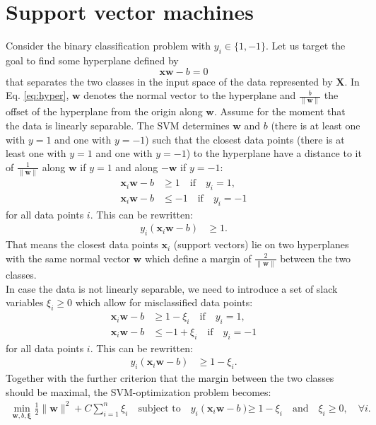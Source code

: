 \documentclass[11pt, a4paper, parskip=half*, bibliography=totoc, cleardoublepage=empty, final,
numbers=noenddot]{scrbook}
\begin{document}
\section{Support vector machines}
Consider the binary classification problem with $y_i \in \{ 1, -1 \}$. Let us target the goal to find some hyperplane defined by
\begin{equation}
\bm{x} \bm{w} - b =0
\label{eq:hyper}
\end{equation} 
that separates the two classes in the input space of the data represented by $\bm{X}$. In Eq. \ref{eq:hyper}, $\bm{w}$ denotes the normal vector to the hyperplane and $\frac{b}{\| \bm{w} \|}$ the offset of the hyperplane from the origin along $\bm{w}$. Assume for the moment that the data is linearly separable. The SVM determines $\bm{w}$ and $b$ (there is at least one with $y=1$ and one with $y=-1$) such that the closest data points (there is at least one with $y=1$ and one with $y=-1$) to the hyperplane have a distance to it of $\frac{1}{\| \bm{w} \|}$ along $\bm{w}$ if $y=1$ and along $-\bm{w}$ if $y=-1$: 
\begin{align}
\bm{x}_i \bm{w} - b &\geq 1 \quad   \text{if} \quad   y_i=1,\\
\bm{x}_i \bm{w} - b &\leq -1 \quad   \text{if} \quad   y_i=-1
\end{align}
for all data points $i$. This can be rewritten:
\begin{align}
y_i(\bm{x}_i \bm{w} - b) &\geq 1.
\end{align}
That means the closest data points $\bm{x}_i$ (support vectors) lie on two hyperplanes with the same normal vector $\bm{w}$ which define a margin of $\frac{2}{\| \bm{w} \|}$ between the two classes. \\
In case the data is not linearly separable, we need to introduce a set of slack variables $\xi_i \geq 0$ which allow for misclassified data points:
\begin{align}
\bm{x}_i \bm{w} - b &\geq 1 - \xi_i\quad   \text{if} \quad   y_i=1,\\
\bm{x}_i \bm{w} - b &\leq -1 + \xi_i \quad   \text{if} \quad   y_i=-1
\end{align}
for all data points $i$. This can be rewritten:
\begin{align}
y_i(\bm{x}_i \bm{w} - b) &\geq 1 - \xi_i.
\end{align}
Together with the further criterion that the margin between the two classes should be maximal, the SVM-optimization problem becomes:
\begin{align}
\min_{\bm{w}, b, \bm{\xi}} \frac{1}{2} \| \bm{w} \|^2 + C \sum_{i=1}^n \xi_i \quad \text{subject to} \quad   y_i(\bm{x}_i \bm{w} - b) &\geq 1 - \xi_i \quad \text{and} \quad \xi_i \geq 0, \quad  \forall i.
\end{align}
\end{document}
